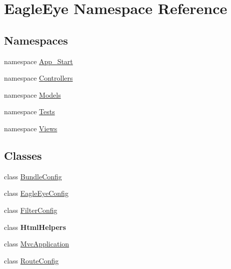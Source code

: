 \hypertarget{namespace_eagle_eye}{}\section{Eagle\+Eye Namespace Reference}
\label{namespace_eagle_eye}
\subsection*{Namespaces}
\begin{DoxyCompactItemize}
\item 
namespace \mbox{\hyperlink{namespace_eagle_eye_1_1_app___start}{App\+\_\+\+Start}}
\item 
namespace \mbox{\hyperlink{namespace_eagle_eye_1_1_controllers}{Controllers}}
\item 
namespace \mbox{\hyperlink{namespace_eagle_eye_1_1_models}{Models}}
\item 
namespace \mbox{\hyperlink{namespace_eagle_eye_1_1_tests}{Tests}}
\item 
namespace \mbox{\hyperlink{namespace_eagle_eye_1_1_views}{Views}}
\end{DoxyCompactItemize}
\subsection*{Classes}
\begin{DoxyCompactItemize}
\item 
class \mbox{\hyperlink{class_eagle_eye_1_1_bundle_config}{Bundle\+Config}}
\item 
class \mbox{\hyperlink{class_eagle_eye_1_1_eagle_eye_config}{Eagle\+Eye\+Config}}
\item 
class \mbox{\hyperlink{class_eagle_eye_1_1_filter_config}{Filter\+Config}}
\item 
class {\bfseries Html\+Helpers}
\item 
class \mbox{\hyperlink{class_eagle_eye_1_1_mvc_application}{Mvc\+Application}}
\item 
class \mbox{\hyperlink{class_eagle_eye_1_1_route_config}{Route\+Config}}
\end{DoxyCompactItemize}
